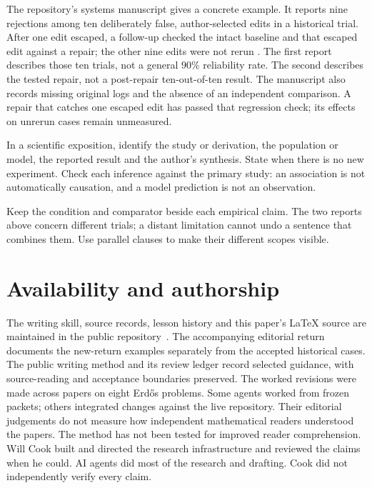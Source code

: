 The repository's systems manuscript gives a concrete example. It reports nine
rejections among ten deliberately false, author-selected edits in a historical
trial. After one edit escaped, a follow-up checked the intact baseline and
that escaped edit against a repair; the other nine edits were not rerun
\cite[recorded observations]{systems}. The first report describes those ten
trials, not a general $90\%$ reliability rate. The second describes the tested
repair, not a post-repair ten-out-of-ten result. The manuscript also records
missing original logs and the absence of an independent comparison. A repair
that catches one escaped edit has passed that regression check; its effects
on unrerun cases remain unmeasured.

In a scientific exposition, identify the study or derivation, the population
or model, the reported result and the author's synthesis. State when there
is no new experiment. Check each inference against the primary study: an
association is not automatically causation, and a model prediction is not
an observation.

Keep the condition and comparator beside each empirical claim. The two reports
above concern different trials; a distant limitation cannot undo a sentence
that combines them. Use parallel clauses to make their different scopes visible.

\section*{Availability and authorship}
The writing skill, source records, lesson history and this paper's LaTeX source
are maintained in the public repository~\cite{ledger,skill}. The accompanying
editorial return documents the new-return examples separately from the accepted
historical cases. The public writing method and its review ledger record
selected guidance, with source-reading and acceptance boundaries preserved.
The worked revisions were made across papers on eight Erd\H{o}s problems.
Some agents worked from frozen packets; others integrated changes against the
live repository. Their editorial judgements do not measure how independent
mathematical readers understood the papers. The method has not been tested
for improved reader comprehension.
Will Cook built and directed the research infrastructure and reviewed
the claims when he could. AI agents did most of the research and drafting.
Cook did not independently verify every claim.
